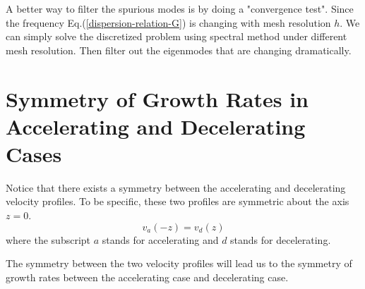 A better way to filter the spurious modes is by doing a "convergence test". Since the frequency Eq.(\ref{dispersion-relation-G}) is changing with mesh resolution $h$. We can simply solve the discretized problem using spectral method under different mesh resolution. Then filter out the eigenmodes that are changing dramatically.

\section{Symmetry of Growth Rates in Accelerating and Decelerating Cases}
Notice that there exists a symmetry between the accelerating and decelerating velocity profiles. To be specific, these two profiles are symmetric about the axis $z=0$.
\[ v_a(-z) = v_d(z) \]
where the subscript $a$ stands for accelerating and $d$ stands for decelerating.

The symmetry between the two velocity profiles will lead us to the symmetry of growth rates between the accelerating case and decelerating case. 

